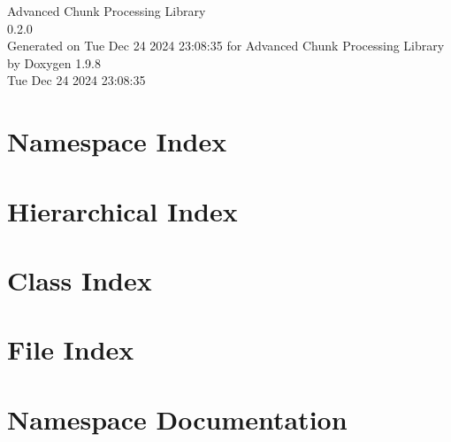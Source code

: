 \documentclass[twoside]{book}
\newcommand{\+}{\discretionary{\mbox{\scriptsize$\hookleftarrow$}}{}{}}
\newcommand{\clearemptydoublepage}{%
    \newpage{\pagestyle{empty}\cleardoublepage}%
  }
\begin{document}
  \raggedbottom
    \hypersetup{pageanchor=false,
                bookmarksnumbered=true,
                pdfencoding=unicode
               }
  \begin{titlepage}
  \vspace*{7cm}
  \begin{center}%
  {\Large Advanced Chunk Processing Library}\\
  [1ex]\large 0.\+2.\+0 \\
  \vspace*{1cm}
  {\large Generated on Tue Dec 24 2024 23\+:08\+:35 for Advanced Chunk Processing Library by Doxygen 1.9.8}\\
    \vspace*{0.5cm}
    {\small Tue Dec 24 2024 23:08:35}
  \end{center}
  \end{titlepage}
  \clearemptydoublepage
  \tableofcontents
  \clearemptydoublepage
  \hypersetup{pageanchor=true}

\chapter{Namespace Index}

\chapter{Hierarchical Index}

\chapter{Class Index}

\chapter{File Index}

\chapter{Namespace Documentation}
















\end{document}
